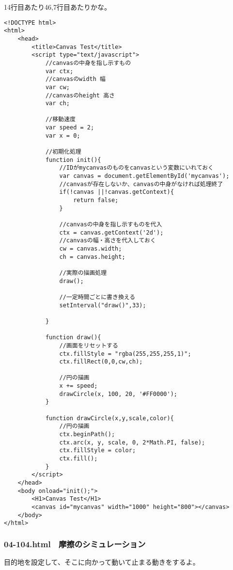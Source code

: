 \documentclass[mingoth,11pt,a4j,uplatex]{jsarticle}
\begin{document}
14行目あたり46,7行目あたりかな。
\begin{lstlisting}[caption=等速度運動]
<!DOCTYPE html>
<html>
	<head>
		<title>Canvas Test</title>
		<script type="text/javascript">
			//canvasの中身を指し示すもの
			var ctx;
			//canvasのwidth 幅
			var cw;
			//canvasのheight 高さ
			var ch;
			
			//移動速度
			var speed = 2;
			var x = 0;
			
			//初期化処理
			function init(){
				//IDがmycanvasのものをcanvasという変数にいれておく
				var canvas = document.getElementById('mycanvas');
				//canvasが存在しないか、canvasの中身がなければ処理終了
				if(!canvas ||!canvas.getContext){
					return false;
				}
				
				//canvasの中身を指し示すものを代入
				ctx = canvas.getContext('2d');
				//canvasの幅・高さを代入しておく
				cw = canvas.width;
				ch = canvas.height;
				
				//実際の描画処理
				draw();
				
				//一定時間ごとに書き換える
				setInterval("draw()",33);

			}
			
			function draw(){
				//画面をリセットする
				ctx.fillStyle = "rgba(255,255,255,1)";
				ctx.fillRect(0,0,cw,ch);
				
				//円の描画
				x += speed;
				drawCircle(x, 100, 20, '#FF0000');
			}
			
			function drawCircle(x,y,scale,color){
				//円の描画
				ctx.beginPath();
				ctx.arc(x, y, scale, 0, 2*Math.PI, false);
				ctx.fillStyle = color;
				ctx.fill();
			}
		</script>
	</head>
	<body onload="init();">
		<H1>Canvas Test</H1>
		<canvas id="mycanvas" width="1000" height="800"></canvas>
	</body>
</html>
\end{lstlisting}

\subsubsection{04-104.html　摩擦のシミュレーション}
目的地を設定して、そこに向かって動いて止まる動きをするよ。
\end{document}
